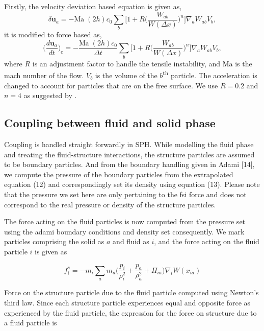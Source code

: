 \documentclass[10pt, conference]{FMFP2022}
\newcommand{\ten}[1]{\ensuremath{\mathbf{#1}}}
\begin{document}
Firstly, the velocity deviation based equation is given as,
\begin{equation}
  \label{eq:sun2019_pst}
  \delta \ten{u}_a = - \text{Ma} \; (2h) c_0 \sum_b \bigg[
  1 + R \bigg( \frac{W_{ab}}{W(\Delta x)} \bigg)^n  \bigg] \nabla_a W_{ab} V_b,
\end{equation}
%
it is modified to force based as,
\begin{equation}
  \label{eq:sun2019_pst}
  \bigg(\frac{d \ten{u}_a}{dt}\bigg)_{\text{c}} = - \frac{\text{Ma} \;
    (2h) c_0}{\Delta t} \sum_b \bigg[1 + R \bigg( \frac{W_{ab}}{W(\Delta x)} \bigg)^n
  \bigg] \nabla_a W_{ab} V_b,
\end{equation}
where $R$ is an adjustment factor to handle the tensile instability, and
$\text{Ma}$ is the mach number of the flow. $V_b$ is the volume of the
$b$\textsuperscript{th} particle. The acceleration is changed to account for
particles that are on the free surface. We use $R = 0.2$ and $n = 4$ as
suggested by \cite{sun_consistent_2019}.


\subsection{\textbf{Coupling between fluid and solid phase}}\label{subsec:fsi}
Coupling is handled straight forwardly in SPH. While modelling the fluid phase
and treating the fluid-structure interactions, the structure particles are
assumed to be boundary particles. And from the boundary handling given in
Adami [14], we compute the pressure of the boundary particles from the
extrapolated equation (12) and correspondingly set its density using equation
(13). Please note that the pressure we set here are only pertaining to the fsi
force and does not correspond to the real pressure or density of the structure
particles.

The force acting on the fluid particles is now computed from the pressure set
using the adami boundary conditions and density set consequently. We mark
particles comprising the solid as $a$ and fluid as $i$, and the force acting
on the fluid particle $i$ is given as

\begin{equation}
  f_i^s = -m_i \sum_{a} m_a \bigg(\frac{p_i}{\rho_{i}^2} +
  \frac{p_a}{\rho_{a}^2} + \Pi_{ia} \bigg) \nabla_{i} W(x_{ia})
\end{equation}

Force on the structure particle due to the fluid particle computed using
Newton's third law. Since each structure particle experiences equal and
opposite force as experienced by the fluid particle, the expression for the
force on structure due to a fluid particle is
\end{document}
